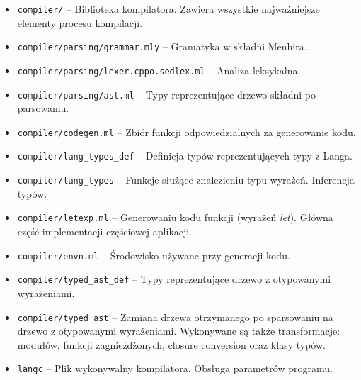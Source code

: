 \documentclass[declaration,shortabstract]{iithesis}
\begin{document}
\begin{itemize}
  \item \texttt{compiler/} -- Biblioteka kompilatora. Zawiera wszystkie 
  najważniejsze elementy procesu kompilacji.
  \item \texttt{compiler/parsing/grammar.mly} -- Gramatyka w składni Menhira.
  \item \texttt{compiler/parsing/lexer.cppo.sedlex.ml} -- Analiza leksykalna.
  \item \texttt{compiler/parsing/ast.ml} -- Typy reprezentujące drzewo składni 
  po parsowaniu.
  \item \texttt{compiler/codegen.ml} -- Zbiór funkcji odpowiedzialnych za 
  generowanie kodu.
  \item \texttt{compiler/lang\_types\_def} -- Definicja typów reprezentujących 
  typy z Langa.
  \item \texttt{compiler/lang\_types} -- Funkcje służące znalezieniu
  typu wyrażeń. Inferencja typów.
  \item \texttt{compiler/letexp.ml} -- Generowaniu kodu funkcji 
  (wyrażeń \textit{let}). 
  Główna część implementacji częściowej aplikacji.
  \item \texttt{compiler/envn.ml} -- Środowisko używane przy 
  generacji kodu.
  \item \texttt{compiler/typed\_ast\_def} -- Typy reprezentujące drzewo 
  z otypowanymi wyrażeniami.
  \item \texttt{compiler/typed\_ast} -- Zamiana drzewa otrzymanego po 
  sparsowaniu na \newline drzewo z otypowanymi wyrażeniami. Wykonywane są także 
  transformacje: modułów, funkcji zagnieżdżonych, closure conversion
  oraz klasy typów.
  \item \texttt{langc} -- Plik wykonywalny kompilatora. Obsługa 
  parametrów programu.

\end{itemize}

\end{document}
